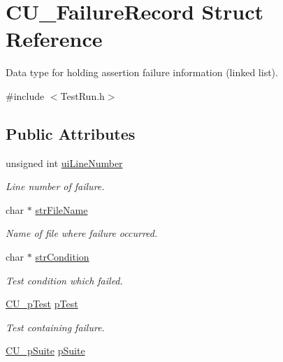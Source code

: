 \hypertarget{struct_c_u___failure_record}{\section{C\+U\+\_\+\+Failure\+Record Struct Reference}
\label{struct_c_u___failure_record}
}


Data type for holding assertion failure information (linked list).  




{\ttfamily \#include $<$Test\+Run.\+h$>$}

\subsection*{Public Attributes}
\begin{DoxyCompactItemize}
\item 
unsigned int \hyperlink{struct_c_u___failure_record_a124d4ce97d29bae29f952250da03536b}{ui\+Line\+Number}
\begin{DoxyCompactList}\small\item\em Line number of failure. \end{DoxyCompactList}\item 
char $\ast$ \hyperlink{struct_c_u___failure_record_a5b72f6fe23e35605545809f435884da3}{str\+File\+Name}
\begin{DoxyCompactList}\small\item\em Name of file where failure occurred. \end{DoxyCompactList}\item 
char $\ast$ \hyperlink{struct_c_u___failure_record_a645edad1e32b1533bd55c501b2c4d591}{str\+Condition}
\begin{DoxyCompactList}\small\item\em Test condition which failed. \end{DoxyCompactList}\item 
\hyperlink{group___framework_ga249c43fbe4e53452b3f90db1437da04b}{C\+U\+\_\+p\+Test} \hyperlink{struct_c_u___failure_record_ad1c88882d83b15d2c2d73a8562f8fced}{p\+Test}
\begin{DoxyCompactList}\small\item\em Test containing failure. \end{DoxyCompactList}\item 
\hyperlink{group___framework_gaba832ae8b235f5e70d6a4ac9c3bb1219}{C\+U\+\_\+p\+Suite} \hyperlink{struct_c_u___failure_record_a773e1afb22505c6fc487043222617731}{p\+Suite}

\end{DoxyCompactItemize}
